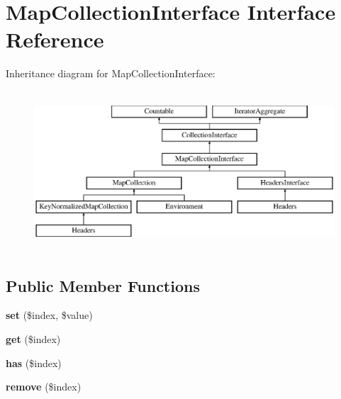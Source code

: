 \hypertarget{interface_pes_1_1_collection_1_1_map_collection_interface}{}\section{Map\+Collection\+Interface Interface Reference}
\label{interface_pes_1_1_collection_1_1_map_collection_interface}
Inheritance diagram for Map\+Collection\+Interface\+:\begin{figure}[H]
\begin{center}
\leavevmode
\includegraphics[height=6.000000cm]{interface_pes_1_1_collection_1_1_map_collection_interface}
\end{center}
\end{figure}
\subsection*{Public Member Functions}
\begin{DoxyCompactItemize}
\item 
\mbox{\label{interface_pes_1_1_collection_1_1_map_collection_interface_a427687601a2304ad0fe3c0a371af9944}} 
{\bfseries set} (\$index, \$value)
\item 
\mbox{\label{interface_pes_1_1_collection_1_1_map_collection_interface_a83366960f81b1627f37353da9768c264}} 
{\bfseries get} (\$index)
\item 
\mbox{\label{interface_pes_1_1_collection_1_1_map_collection_interface_a709fab8b3056d23e5cf2be3d5c6eda21}} 
{\bfseries has} (\$index)
\item 
\mbox{\label{interface_pes_1_1_collection_1_1_map_collection_interface_a2554c1a74c0099a5c59e6fa2875de396}} 
{\bfseries remove} (\$index)
\end{DoxyCompactItemize}



